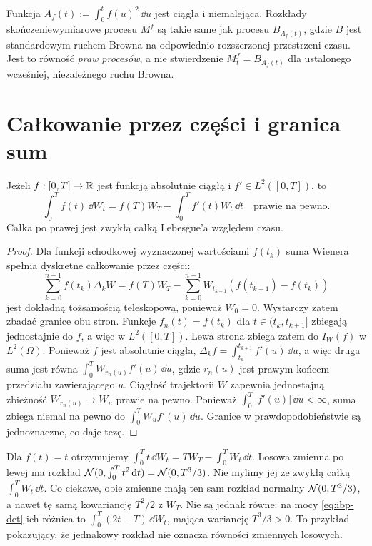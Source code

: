 \begin{uwaga}
Funkcja $A_f(t):=\int_0^tf(u)^2\,\dd u$ jest ciągła
i niemalejąca. Rozkłady skończeniewymiarowe procesu $M^f$
są takie same jak procesu $B_{A_f(t)}$, gdzie $B$
jest standardowym ruchem Browna na odpowiednio rozszerzonej
przestrzeni czasu. Jest to równość \emph{praw procesów},
a nie stwierdzenie $M_t^f=B_{A_f(t)}$ dla ustalonego
wcześniej, niezależnego ruchu Browna.
\end{uwaga}

\section{Całkowanie przez części i granica sum}
\begin{twierdzenie}
Jeżeli $f:[0,T]\to\mathbb{R}$ jest funkcją absolutnie ciągłą
i $f'\in L^2([0,T])$, to
\[
\int_0^T f(t)\,\dd W_t
=f(T)W_T-\int_0^T f'(t)W_t\,\dd t
\quad\text{prawie na pewno}.
\tag{1.6}\label{eq:ibp-det}
\]
Całka po prawej jest zwykłą całką Lebesgue'a względem czasu.
\end{twierdzenie}
\begin{proof}
Dla funkcji schodkowej wyznaczonej wartościami $f(t_k)$
suma Wienera spełnia dyskretne całkowanie przez części:
\[
\sum_{k=0}^{n-1}f(t_k)\Delta_kW
=f(T)W_T-\sum_{k=0}^{n-1}W_{t_{k+1}}(f(t_{k+1})-f(t_k))
\]
jest dokładną tożsamością teleskopową, ponieważ $W_0=0$.
Wystarczy zatem zbadać granice obu stron. Funkcje $f_n(t)=f(t_k)$ dla
$t\in(t_k,t_{k+1}]$ zbiegają jednostajnie do $f$,
a więc w $L^2([0,T])$. Lewa strona zbiega zatem do
$I_W(f)$ w $L^2(\Omega)$.
Ponieważ $f$ jest absolutnie ciągła,
$\Delta_k f=\int_{t_k}^{t_{k+1}}f'(u)\,\dd u$,
a więc druga suma jest równa
$\int_0^T W_{r_n(u)}f'(u)\,\dd u$,
gdzie $r_n(u)$ jest prawym końcem przedziału zawierającego $u$.
Ciągłość trajektorii $W$ zapewnia jednostajną zbieżność
$W_{r_n(u)}\to W_u$ prawie na pewno. Ponieważ
$\int_0^T|f'(u)|\,\dd u<\infty$, suma zbiega niemal
na pewno do $\int_0^TW_uf'(u)\,\dd u$.
Granice w prawdopodobieństwie są jednoznaczne, co daje tezę.
\end{proof}

\begin{przyklad}
Dla $f(t)=t$ otrzymujemy
$\int_0^Tt\,\dd W_t=T W_T-\int_0^TW_t\,\dd t$.
Losowa zmienna po lewej ma rozkład
$\mathcal{N}(0,\int_0^Tt^2\,\mathrm{d} t)=\mathcal{N}(0,T^3/3)$.
Nie mylimy jej ze zwykłą całką $\int_0^TW_t\,\dd t$.
Co ciekawe, obie zmienne mają ten sam rozkład normalny
$\mathcal{N}(0,T^3/3)$, a nawet tę samą kowariancję
$T^2/2$ z $W_T$. Nie są jednak równe:
na mocy \eqref{eq:ibp-det} ich różnica to
$\int_0^T(2t-T)\,\dd W_t$, mająca wariancję
$T^3/3>0$. To przykład pokazujący, że jednakowy
rozkład nie oznacza równości zmiennych losowych.
\end{przyklad}

